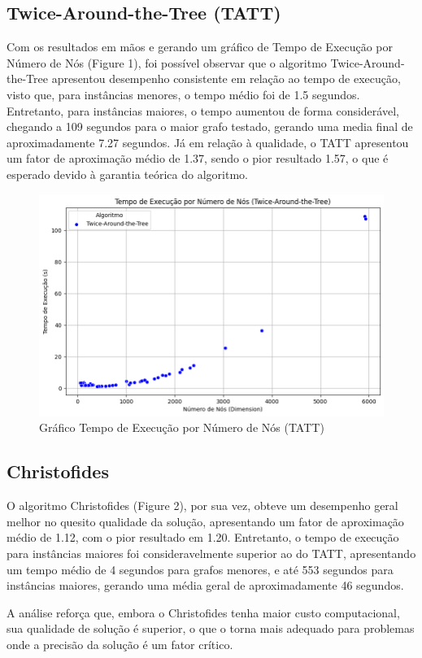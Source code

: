 \documentclass[12pt]{article}
\begin{document}
\subsection{Twice-Around-the-Tree (TATT)}
Com os resultados em mãos e gerando um gráfico de Tempo de Execução por Número de Nós (Figure 1), foi possível observar que o algoritmo Twice-Around-the-Tree apresentou desempenho consistente em relação ao tempo de execução, visto que, para instâncias menores, o tempo médio foi de 1.5 segundos. Entretanto, para instâncias maiores, o tempo aumentou de forma considerável, chegando a 109 segundos para o maior grafo testado, gerando uma media final de aproximadamente 7.27 segundos. Já em relação à qualidade, o TATT apresentou um fator de aproximação médio de 1.37, sendo o pior resultado 1.57, o que é esperado devido à garantia teórica do algoritmo.

\begin{figure}[ht]
\centering
\includegraphics[width=.7\textwidth]{Figure1.png}
\caption{Gráfico Tempo de Execução por Número de Nós (TATT)}
\label{fig:exampleFig2}
\end{figure}

\subsection{Christofides}
O algoritmo Christofides (Figure 2), por sua vez, obteve um desempenho geral melhor no quesito qualidade da solução, apresentando um fator de aproximação médio de 1.12, com o pior resultado em 1.20. Entretanto, o tempo de execução para instâncias maiores foi consideravelmente superior ao do TATT, apresentando um tempo médio de 4 segundos para grafos menores, e até 553 segundos para instâncias maiores, gerando uma média geral de aproximadamente 46 segundos.

A análise reforça que, embora o Christofides tenha maior custo computacional, sua qualidade de solução é superior, o que o torna mais adequado para problemas onde a precisão da solução é um fator crítico.
\\
\\
\\
\\
\end{document}
